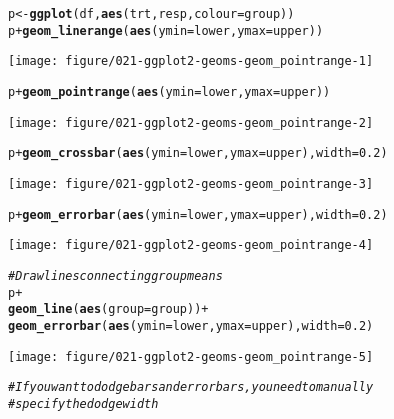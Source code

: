 \documentclass[a4paper,titlepage]{tufte-handout}\usepackage[]{graphicx}\usepackage[]{color}
\makeatletter
\def\maxwidth{ %
  \ifdim\Gin@nat@width>\linewidth
    \linewidth
  \else
    \Gin@nat@width
  \fi
}
\newcommand{\hlnum}[1]{\textcolor[rgb]{0.686,0.059,0.569}{#1}}%
\newcommand{\hlcom}[1]{\textcolor[rgb]{0.678,0.584,0.686}{\textit{#1}}}%
\newcommand{\hlopt}[1]{\textcolor[rgb]{0,0,0}{#1}}%
\newcommand{\hlstd}[1]{\textcolor[rgb]{0.345,0.345,0.345}{#1}}%
\newcommand{\hlkwb}[1]{\textcolor[rgb]{0.69,0.353,0.396}{#1}}%
\newcommand{\hlkwc}[1]{\textcolor[rgb]{0.333,0.667,0.333}{#1}}%
\newcommand{\hlkwd}[1]{\textcolor[rgb]{0.737,0.353,0.396}{\textbf{#1}}}%
\newenvironment{kframe}{%
 \def\at@end@of@kframe{}%
 \ifinner\ifhmode%
  \def\at@end@of@kframe{\end{minipage}}%
  \begin{minipage}{\columnwidth}%
 \fi\fi%
 \def\FrameCommand##1{\hskip\@totalleftmargin \hskip-\fboxsep
 \colorbox{shadecolor}{##1}\hskip-\fboxsep
     \hskip-\linewidth \hskip-\@totalleftmargin \hskip\columnwidth}%
 \MakeFramed {\advance\hsize-\width
   \@totalleftmargin\z@ \linewidth\hsize
   \@setminipage}}%
 {\par\unskip\endMakeFramed%
 \at@end@of@kframe}
\newenvironment{knitrout}{}{} %
\makeatother
\begin{document}
\begin{knitrout}
\begin{kframe}
\begin{alltt}
\hlstd{p} \hlkwb{<-} \hlkwd{ggplot}\hlstd{(df,} \hlkwd{aes}\hlstd{(trt, resp,} \hlkwc{colour} \hlstd{= group))}
\hlstd{p} \hlopt{+} \hlkwd{geom_linerange}\hlstd{(}\hlkwd{aes}\hlstd{(}\hlkwc{ymin} \hlstd{= lower,} \hlkwc{ymax} \hlstd{= upper))}
\end{alltt}
\end{kframe}
\texttt{[image: figure/021-ggplot2-geoms-geom\_pointrange-1]} 
\begin{kframe}\begin{alltt}
\hlstd{p} \hlopt{+} \hlkwd{geom_pointrange}\hlstd{(}\hlkwd{aes}\hlstd{(}\hlkwc{ymin} \hlstd{= lower,} \hlkwc{ymax} \hlstd{= upper))}
\end{alltt}
\end{kframe}
\texttt{[image: figure/021-ggplot2-geoms-geom\_pointrange-2]} 
\begin{kframe}\begin{alltt}
\hlstd{p} \hlopt{+} \hlkwd{geom_crossbar}\hlstd{(}\hlkwd{aes}\hlstd{(}\hlkwc{ymin} \hlstd{= lower,} \hlkwc{ymax} \hlstd{= upper),} \hlkwc{width} \hlstd{=} \hlnum{0.2}\hlstd{)}
\end{alltt}
\end{kframe}
\texttt{[image: figure/021-ggplot2-geoms-geom\_pointrange-3]} 
\begin{kframe}\begin{alltt}
\hlstd{p} \hlopt{+} \hlkwd{geom_errorbar}\hlstd{(}\hlkwd{aes}\hlstd{(}\hlkwc{ymin} \hlstd{= lower,} \hlkwc{ymax} \hlstd{= upper),} \hlkwc{width} \hlstd{=} \hlnum{0.2}\hlstd{)}
\end{alltt}
\end{kframe}
\texttt{[image: figure/021-ggplot2-geoms-geom\_pointrange-4]} 
\begin{kframe}\begin{alltt}
\hlcom{# Draw lines connecting group means}
\hlstd{p} \hlopt{+}
  \hlkwd{geom_line}\hlstd{(}\hlkwd{aes}\hlstd{(}\hlkwc{group} \hlstd{= group))} \hlopt{+}
  \hlkwd{geom_errorbar}\hlstd{(}\hlkwd{aes}\hlstd{(}\hlkwc{ymin} \hlstd{= lower,} \hlkwc{ymax} \hlstd{= upper),} \hlkwc{width} \hlstd{=} \hlnum{0.2}\hlstd{)}
\end{alltt}
\end{kframe}
\texttt{[image: figure/021-ggplot2-geoms-geom\_pointrange-5]} 
\begin{kframe}\begin{alltt}
\hlcom{# If you want to dodge bars and errorbars, you need to manually}
\hlcom{# specify the dodge width}

\end{alltt}
\end{kframe}
\end{knitrout}
\end{document}
